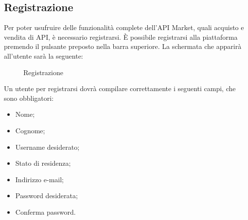 	\subsection{Registrazione}
	Per poter usufruire delle funzionalità complete dell'API Market, quali acquisto e vendita di API, è necessario registrarsi. \MakeUppercase{è} possibile registrarsi alla piattaforma premendo il pulsante preposto nella barra superiore. La schermata che apparirà all'utente sarà la seguente:
	
	\label{Registrazione}
	\begin{figure}[H]
		\centering
		\caption{Registrazione}
	\end{figure}
	
	Un utente per registrarsi dovrà compilare correttamente i seguenti campi, che sono obbligatori:
	\begin{itemize}
		\item Nome;
		\item Cognome;
		\item Username desiderato;
		\item Stato di residenza;
		\item Indirizzo e-mail;
		\item Password desiderata;
		\item Conferma password.
	\end{itemize}
	
